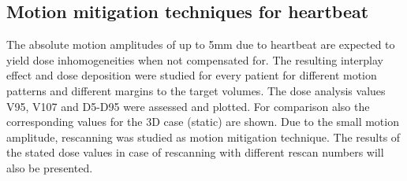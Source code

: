 \newpage
\subsection{Motion mitigation techniques for heartbeat}

The absolute motion amplitudes of up to 5mm due to heartbeat are expected to yield dose inhomogeneities when not compensated for. The 
resulting interplay effect and dose deposition were studied for every patient for different motion patterns and different margins to the target 
volumes. The dose analysis values V95, V107 and D5-D95 were assessed and plotted. For comparison also the corresponding 
values for the 3D case (static) are shown. Due to the small motion amplitude, rescanning was studied as motion mitigation technique.  
The results of the stated dose values in case of rescanning with different rescan numbers will also be presented. 


